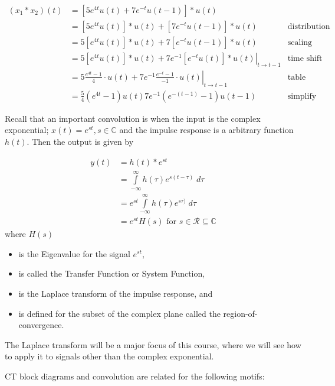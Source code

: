 \documentclass{article}
\begin{document}
\begin{align}
  (x_1 * x_2)(t) &= \left[ 5e^{4t}u(t) + 7e^{-t}u(t-1) \right] * u(t) &\\
  &= \left[ 5e^{4t}u(t) \right] * u(t) + \left[ 7e^{-t}u(t-1) \right] * u(t) & \text{distribution property}\\
  &= 5\left[e^{4t}u(t) \right] * u(t) + 7\left[e^{-t}u(t-1) \right] * u(t) & \text{scaling property}\\
  &= 5\left[e^{4t}u(t) \right] * u(t) + 7e^{-1}\left. \left[e^{-t}u(t) \right] * u(t)\right|_{t\rightarrow t-1} & \text{time shift property}\\
  &= 5 \frac{e^{4t} - 1}{4}\cdot u(t) + 7e^{-1}\left. \frac{e^{-t} - 1}{-1}\cdot u(t)\right|_{t\rightarrow t-1} & \text{table application}\\
  &= \frac{5}{4}\left(e^{4t} -1 \right)u(t) 7e^{-1} \left(e^{-(t-1)} -1 \right)u(t-1) & \text{simplify}
\end{align}

Recall that an important convolution is when the input is the complex exponential; $x(t) = e^{st}, s\in\mathbb{C}$ and the impulse response is a arbitrary function $h(t)$. Then the output is given by

\begin{align}
  y(t) &= h(t) * e^{st}\\
  &= \int\limits_{-\infty}^{\infty} h(\tau)e^{s(t-\tau)}\; d\tau \\
  &= e^{st} \int\limits_{-\infty}^{\infty} h(\tau)e^{s\tau)}\; d\tau \\
  &= e^{st} H(s) \text{ for } s\in \mathcal{R} \subseteq \mathbb{C}
\end{align}
where $H(s)$

\begin{itemize}
\item is the Eigenvalue for the signal $e^{st}$, 
\item is called the Transfer Function or System Function,
\item is the Laplace transform of the impulse response, and
\item is defined for the subset of the complex plane called the region-of-convergence.
\end{itemize}

The Laplace transform will be a major focus of this course, where we will see how to apply it to signals other than the complex exponential.

CT block diagrams and convolution are related for the following motifs:
\end{document}
